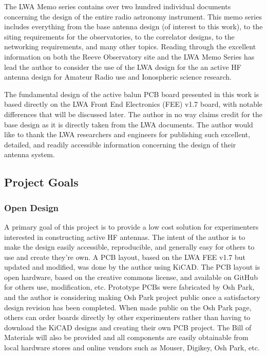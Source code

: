 The LWA Memo series contains over two hundred individual documents concerning the design of the entire radio astronomy instrument.  
This memo series includes everything from the base antenna design (of interest to this work), to the siting requirements for the observatories, to the correlator designs, to the networking requirements, and many other topics.
Reading through the excellent information on both the Reeve Observatory site and the LWA Memo Series has lead the author to consider the use of the LWA design for the an active HF antenna design for Amateur Radio use and Ionospheric science research.

The fundamental design of the active balun PCB board presented in this work is based directly on the LWA Front End Electronics (FEE) v1.7 board, with notable differences that will be discussed later.
The author in no way claims credit for the base design as it is directly taken from the LWA documents.
The author would like to thank the LWA researchers and engineers for publishing such excellent, detailed, and readily accessible information concerning the design of their antenna system.


\subsection{Project Goals}
\label{subsec:intro:project_goals}
\subsubsection{Open Design}
\label{subsubsec:intro:project_goals:open_design}
A primary goal of this project is to provide a low cost solution for experimenters interested in constructing active HF antennas.
The intent of the author is to make the design easily accessible, reproducible, and generally easy for others to use and create they're own.
A PCB layout, based on the LWA FEE v1.7 but updated and modified, was done by the author using KiCAD.
The PCB layout is open hardware, based on the creative commons license, and available on GitHub for others use, modification, etc.
Prototype PCBs were fabricated by Osh Park, and the author is considering making Osh Park project public once a satisfactory design revision has been completed.
When made public on the Osh Park page, others can order boards directly by other experimenters rather than having to download the KiCAD designs and creating their own PCB project.
The Bill of Materials will also be provided and all components are easily obtainable from local hardware stores and online vendors such as Mouser, Digikey, Osh Park, etc.

